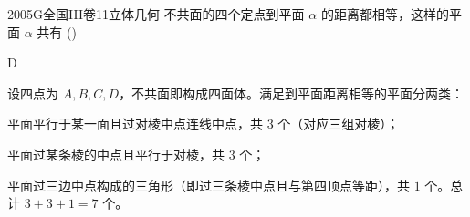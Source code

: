 
\begin{problem}{2005}{G}{全国III卷}{11}{立体几何}
不共面的四个定点到平面 $ \alpha $ 的距离都相等，这样的平面 $ \alpha $ 共有 (\hspace{1cm})
\begin{choices}
\end{choices}
\end{problem}

\begin{answer}
D
\end{answer}

\begin{solutions}
设四点为 $A,B,C,D$，不共面即构成四面体。满足到平面距离相等的平面分两类：

 平面平行于某一面且过对棱中点连线中点，共 $3$ 个（对应三组对棱）；

 平面过某条棱的中点且平行于对棱，共 $3$ 个；

 平面过三边中点构成的三角形（即过三条棱中点且与第四顶点等距），共 $1$ 个。总计 $3+3+1=7$ 个。
\end{solutions}